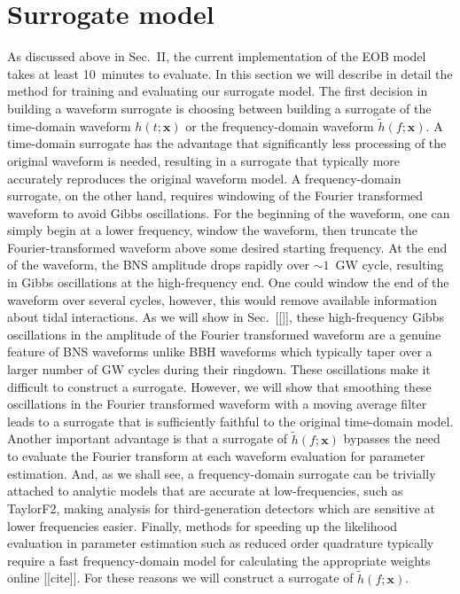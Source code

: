 \documentclass[prd,aps,letter,twocolumn,floatfix,notitlepage,nofootinbib]{revtex4-1}
\def\bx{\mathbf{x}}
\begin{document}
\section{Surrogate model}

As discussed above in Sec.~II, the current implementation of the EOB model takes at least 10~minutes to evaluate. In this section we will describe in detail the method for training and evaluating our surrogate model. The first decision in building a waveform surrogate is choosing between building a surrogate of the time-domain waveform $h(t;\bx)$ or the frequency-domain waveform $\tilde h(f;\bx)$. A time-domain surrogate has the advantage that significantly less processing of the original waveform is needed, resulting in a surrogate that typically more accurately reproduces the original waveform model. A frequency-domain surrogate, on the other hand, requires windowing of the Fourier transformed waveform to avoid Gibbs oscillations. For the beginning of the waveform, one can simply begin at a lower frequency, window the waveform, then truncate the Fourier-transformed waveform above some desired starting frequency. At the end of the waveform, the BNS amplitude drops rapidly over $\sim 1$~GW cycle, resulting in Gibbs oscillations at the high-frequency end. One could window the end of the waveform over several cycles, however, this would remove available information about tidal interactions. As we will show in Sec.~[[]], these high-frequency Gibbs oscillations in the amplitude of the Fourier transformed waveform are a genuine feature of BNS waveforms unlike BBH waveforms which typically taper over a larger number of GW cycles during their ringdown. These oscillations make it difficult to construct a surrogate. However, we will show that smoothing these oscillations in the Fourier transformed waveform with a moving average filter leads to a surrogate that is sufficiently faithful to the original time-domain model. Another important advantage is that a surrogate of $\tilde h(f;\bx)$ bypasses the need to evaluate the Fourier transform at each waveform evaluation for parameter estimation. And, as we shall see, a frequency-domain surrogate can be trivially attached to analytic models that are accurate at low-frequencies, such as TaylorF2, making analysis for third-generation detectors which are sensitive at lower frequencies easier. Finally, methods for speeding up the likelihood evaluation in parameter estimation such as reduced order quadrature typically require a fast frequency-domain model for calculating the appropriate weights online [[cite]]. For these reasons we will construct a surrogate of $\tilde h(f;\bx)$.
\end{document}
